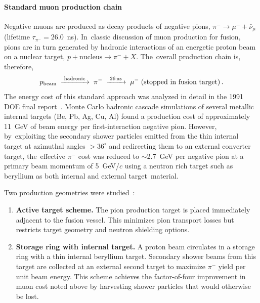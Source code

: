 \documentclass[particles,article,accept,pdftex,moreauthors]{Definitions/mdpi}
\begin{document}
\vspace{-6pt}\paragraph*{\bf Standard muon production chain}
Negative muons are produced as decay products of negative pions, $\pi^-\to\mu^-+\bar\nu_\mu$ (lifetime $\tau_{\pi^-}=26.0$~ns). In~classic discussion of muon production for fusion, pions are in turn generated by hadronic interactions of an energetic proton beam on a nuclear target, $p+\mathrm{nucleus}\to \pi^-+X$. The~overall production chain is, therefore,
\begin{equation}
p_{\rm beam}\;\xrightarrow{\;\rm hadronic\;}\;\pi^-\;\xrightarrow{\;26\,\mathrm{ns}\;}\;\mu^-\;(\text{stopped in fusion target})\,.
\end{equation}
The energy cost of this standard approach was analyzed in detail in the 1991 DOE final report~\cite{Rafelski:1991DOE}. Monte Carlo hadronic cascade simulations of several metallic internal targets (Be, Pb, Ag, Cu, Al) found a production cost of approximately 11~GeV of beam energy per first-interaction negative pion. However, by~exploiting the secondary shower particles emitted from the thin internal target at azimuthal angles $>36^\circ$ and redirecting them to an external converter target, the~effective $\pi^-$ cost was reduced to $\sim$2.7~GeV per negative pion at a primary beam momentum of 5~GeV/$c$ using a neutron rich target such as beryllium as both internal and external target~material.

Two production geometries were studied~\cite{Rafelski:1991DOE}:
\begin{enumerate}
\item[(1)] \textbf{Active target scheme.} The pion production target is placed immediately adjacent to the fusion vessel. This minimizes pion transport losses but restricts target geometry and neutron shielding options.
\item[(2)] \textbf{Storage ring with internal target.} A proton beam circulates in a storage ring with a thin internal beryllium target. Secondary shower beams from this target are collected at an external second target to maximize $\pi^-$ yield per unit beam energy. This scheme
achieves the factor-of-four improvement in muon cost noted above by harvesting shower particles that would otherwise be lost.
\end{enumerate}
\end{document}
